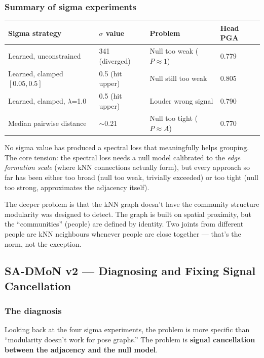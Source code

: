 \subsubsection{Summary of sigma experiments}

\begin{center}
\begin{tabular}{llll}
\toprule
Sigma strategy & $\sigma$ value & Problem & Head PGA \\
\midrule
Learned, unconstrained & 341 (diverged) & Null too weak ($P \approx 1$) & 0.779 \\
Learned, clamped $[0.05, 0.5]$ & 0.5 (hit upper) & Null still too weak & 0.805 \\
Learned, clamped, $\lambda$=1.0 & 0.5 (hit upper) & Louder wrong signal & 0.790 \\
Median pairwise distance & $\sim$0.21 & Null too tight ($P \approx A$) & 0.770 \\
\bottomrule
\end{tabular}
\end{center}

No sigma value has produced a spectral loss that meaningfully helps grouping. The core tension: the spectral loss needs a null model calibrated to the \emph{edge formation scale} (where kNN connections actually form), but every approach so far has been either too broad (null too weak, trivially exceeded) or too tight (null too strong, approximates the adjacency itself).

The deeper problem is that the kNN graph doesn't have the community structure modularity was designed to detect. The graph is built on spatial proximity, but the ``communities'' (people) are defined by identity. Two joints from different people are kNN neighbours whenever people are close together --- that's the norm, not the exception.


\subsection{SA-DMoN v2 --- Diagnosing and Fixing Signal Cancellation}

\subsubsection{The diagnosis}

Looking back at the four sigma experiments, the problem is more specific than ``modularity doesn't work for pose graphs.'' The problem is \textbf{signal cancellation between the adjacency and the null model}.

